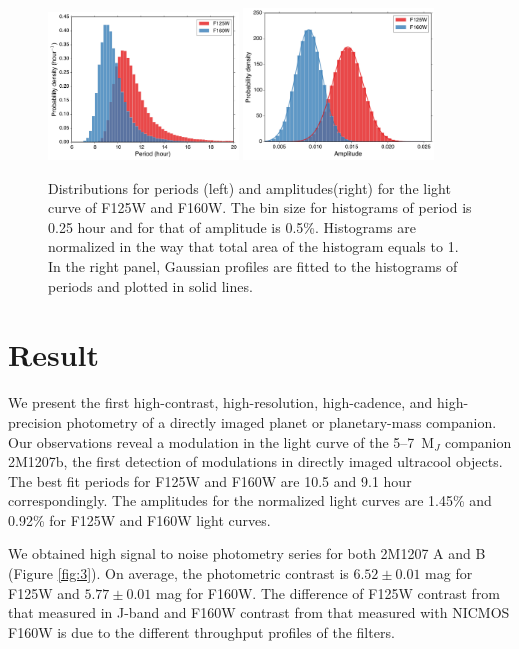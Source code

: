 \documentclass[apj]{emulateapj}
\begin{document}
\begin{figure}
  \centering
  \includegraphics[width=0.45\textwidth]{periodDistr}
  \includegraphics[width=0.45\textwidth]{amplitudeDistr}
  \caption{Distributions for periods (left) and amplitudes(right) for the light
    curve of F125W and F160W. The bin size for histograms of period is
  0.25 hour and for that of amplitude is 0.5\%. Histograms are
  normalized in the way that total area of the histogram equals to
  1. In the right panel, Gaussian profiles are fitted to the
  histograms of periods and plotted in solid lines.}
  \label{fig:4}
\end{figure}

\section{Result}



\label{Results}
We present the first high-contrast, high-resolution, high-cadence, and
high-precision photometry of a directly imaged planet or
planetary-mass companion. Our observations reveal a modulation in the
light curve of the 5--7~M$_{J}$ companion 2M1207b, the first detection
of modulations in directly imaged ultracool objects.  The best fit
periods for F125W and F160W are 10.5 and 9.1 hour correspondingly. The
amplitudes for the normalized light curves are 1.45\% and 0.92\% for
F125W and F160W light curves. 

We obtained high signal to noise photometry series for both 2M1207 A
and B (Figure \ref{fig:3}). On average, the photometric contrast is
$6.52\pm0.01$ mag for
F125W and $5.77\pm0.01$ mag for F160W. The difference of F125W contrast
from that measured in J-band \citep{Mohanty2007} and
F160W contrast from that measured with NICMOS F160W 
\citep{Song2006} is due to the different throughput profiles of the
filters.
\end{document}
